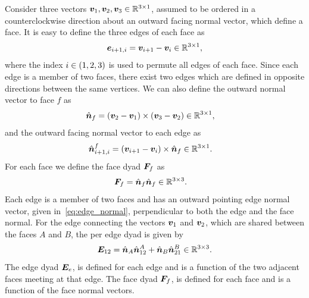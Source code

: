\documentclass[letterpaper, paper,11pt]{AAS}		%
\begin{document}
Consider three vectors \( \bm{v}_1, \bm{v}_2, \bm{v}_3 \in \mathbb{R}^{3 \times 1} \), assumed to be ordered in a counterclockwise direction about an outward facing normal vector, which define a face.
It is easy to define the three edges of each face as
\begin{align}\label{eq:edges}
    \bm{e}_{i+1,i} = \bm{v}_{i+1} - \bm{v}_i \in \mathbb{R}^{3 \times 1 },
\end{align}
where the index \( i \in \left( 1,2,3 \right) \) is used to permute all edges of each face.
Since each edge is a member of two faces, there exist two edges which are defined in opposite directions between the same vertices.
We can also define the outward normal vector to face \( f\)  as
\begin{align}\label{eq:face_normal}
    \hat{\bm{n}}_f &= \left( \bm{v}_{2} - \bm{v}_1 \right) \times \left( \bm{v}_{3} - \bm{v}_2 \right) \in \mathbb{R}^{3 \times 1},
\end{align}
and the outward facing normal vector to each edge as
\begin{align}\label{eq:edge_normal}
    \hat{\bm{n}}_{i+1,i}^f &= \left( \bm{v}_{i+1} - \bm{v}_i \right) \times \hat{\bm{n}}_f \in \mathbb{R}^{3 \times 1}.
\end{align}
For each face we define the face dyad \( \bm{F}_f \) as
\begin{align}\label{eq:face_dyad}
    \bm{F}_f &= \hat{\bm{n}}_f \hat{\bm{n}}_f \in \mathbb{R}^{3 \times 3}.
\end{align}
Each edge is a member of two faces and has an outward pointing edge normal vector, given in~\cref{eq:edge_normal}, perpendicular to both the edge and the face normal.
For the edge connecting the vectors \( \bm{v}_1 \) and \( \bm{v}_2 \), which are shared between the faces \(A\) and \( B\), the per edge dyad is given by
\begin{align}\label{eq:edge_dyad}
    \bm{E}_{12} = \hat{\bm{n}}_A \hat{\bm{n}}_{12}^A + \hat{\bm{n}}_B \hat{\bm{n}}_{21}^B \in \mathbb{R}^{3 \times 3}.
\end{align}
The edge dyad \( \bm{E}_e  \), is defined for each edge and is a function of the two adjacent faces meeting at that edge.
The face dyad \( \bm{F}_f \), is defined for each face and is a function of the face normal vectors.
\end{document}
